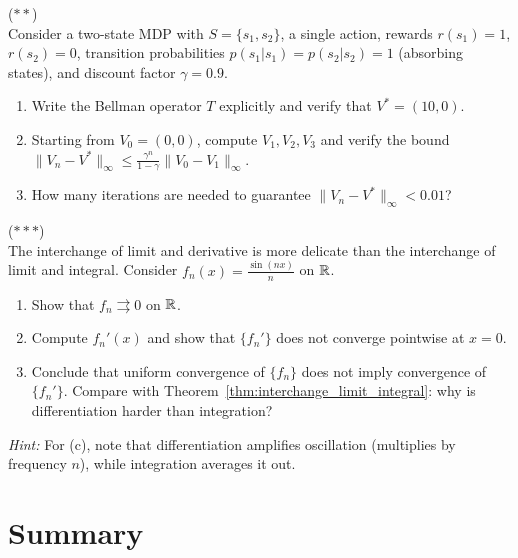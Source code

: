\documentclass[11pt,a4paper]{article}
\begin{document}
\begin{exercise}
\textnormal{(\(**\))} \\
Consider a two-state MDP with $S = \{s_1, s_2\}$, a single action,
rewards $r(s_1) = 1$, $r(s_2) = 0$, transition probabilities
$p(s_1 | s_1) = p(s_2 | s_2) = 1$ (absorbing states), and discount
factor $\gamma = 0.9$.
\begin{enumerate}[nosep,label=(\alph*)]
  \item Write the Bellman operator $T$ explicitly and verify that
    $V^* = (10, 0)$.
  \item Starting from $V_0 = (0, 0)$, compute $V_1, V_2, V_3$ and
    verify the bound
    $\|V_n - V^*\|_\infty \le \frac{\gamma^n}{1-\gamma}\|V_0 - V_1\|_\infty$.
  \item How many iterations are needed to guarantee
    $\|V_n - V^*\|_\infty < 0.01$?
\end{enumerate}
\end{exercise}

\begin{exercise}
\textnormal{(\(***\))} \\
The interchange of limit and derivative is more delicate than the
interchange of limit and integral. Consider $f_n(x) = \frac{\sin(nx)}{n}$
on $\mathbb{R}$.
\begin{enumerate}[nosep,label=(\alph*)]
  \item Show that $f_n \rightrightarrows 0$ on $\mathbb{R}$.
  \item Compute $f_n'(x)$ and show that $\{f_n'\}$ does not converge
    pointwise at $x = 0$.
  \item Conclude that uniform convergence of $\{f_n\}$ does not imply
    convergence of $\{f_n'\}$. Compare with
    Theorem~\ref{thm:interchange_limit_integral}: why is
    differentiation harder than integration?
\end{enumerate}
\textit{Hint:} For (c), note that differentiation amplifies oscillation
(multiplies by frequency $n$), while integration averages it out.
\end{exercise}

\section{Summary}
\label{sec:summary}
\end{document}
